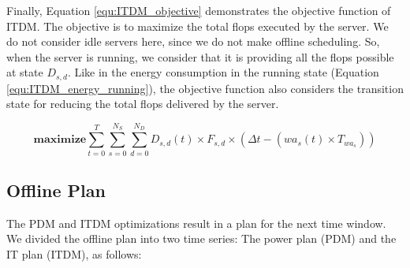 Finally, Equation \ref{equ:ITDM_objective} demonstrates the objective function of ITDM. The objective is to maximize the total flops executed by the server. We do not consider idle servers here, since we do not make offline scheduling. So, when the server is running, we consider that it is providing all the flops possible at state $D_{s,d}$. Like in the energy consumption in the running state (Equation \ref{equ:ITDM_energy_running}), the objective function also considers the transition state for reducing the total flops delivered by the server.

\begin{equation}
    \label{equ:ITDM_objective}
    \mathbf{maximize} \sum_{t=0}^{T}\sum_{s=0}^{N_{S}}\sum_{d=0}^{N_{D}} D_{s,d}(t) \times F_{s,d} \times (\Delta t - (wa_{s}(t) \times T_{wa_{s}}))
\end{equation}



\subsection{Offline Plan}
\label{sec:offline_plan}

The PDM and ITDM optimizations result in a plan for the next time window. We divided the offline plan into two time series: The power plan (PDM) and the IT plan (ITDM), as follows:

